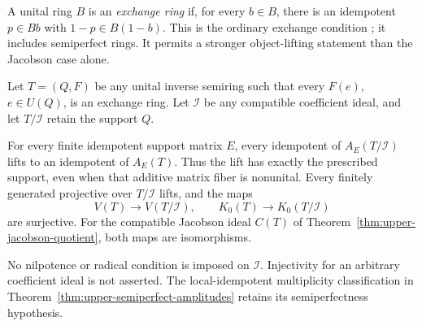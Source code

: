 A unital ring $B$ is an \emph{exchange ring} if, for every
$b\in B$, there is an idempotent $p\in Bb$ with
$1-p\in B(1-b)$. This is the ordinary exchange condition
\cite[Proposition~1.1 and Theorem~2.1]{NicholsonExchange}; it
includes semiperfect rings. It permits a stronger object-lifting
statement than the Jacobson case alone.

\begin{theorem}
\label{thm:exchange-coefficient-lifting}
Let $T=(Q,F)$ be any unital inverse semiring such that every
$F(e)$, $e\in U(Q)$, is an exchange ring. Let $\mathcal I$
be any compatible coefficient ideal, and let $T/\mathcal I$
retain the support $Q$.

For every finite idempotent support matrix $E$, every idempotent
of $A_E(T/\mathcal I)$ lifts to an idempotent of $A_E(T)$.
Thus the lift has exactly the prescribed support, even when
that additive matrix fiber is nonunital. Every finitely generated
projective over $T/\mathcal I$ lifts, and the maps
\[
 V(T)\longrightarrow V(T/\mathcal I),\qquad
 K_0(T)\longrightarrow K_0(T/\mathcal I)
\]
are surjective. For the compatible Jacobson ideal $C(T)$ of
Theorem~\ref{thm:upper-jacobson-quotient}, both maps are
isomorphisms.
\end{theorem}

No nilpotence or radical condition is imposed on $\mathcal I$.
Injectivity for an arbitrary coefficient ideal is not asserted.
The local-idempotent multiplicity classification in
Theorem~\ref{thm:upper-semiperfect-amplitudes} retains its
semiperfectness hypothesis.
